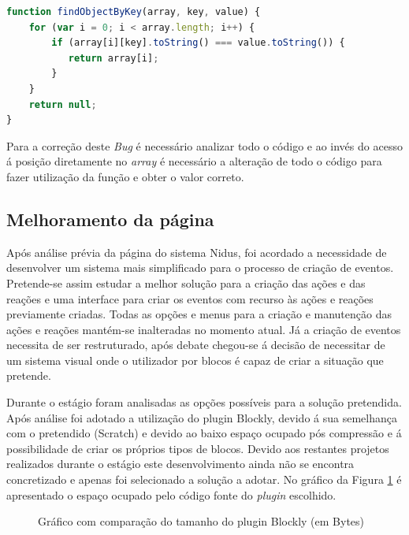 \begin{lstlisting}[caption=Função findObjectByKey,label={js2},language=JavaScript]
function findObjectByKey(array, key, value) {
    for (var i = 0; i < array.length; i++) {
        if (array[i][key].toString() === value.toString()) {
           return array[i];
        }
    }
    return null;
}
\end{lstlisting}

\par Para a correção deste \textit{Bug} é necessário analizar todo o código e ao invés do acesso á posição diretamente no \textit{array} é necessário a alteração de todo o código para fazer utilização da função e obter o valor correto.


\subsection{Melhoramento da página}
\par Após análise prévia da página do sistema Nidus, foi acordado a necessidade de desenvolver um sistema mais simplificado para o processo de criação de eventos. Pretende-se assim estudar a melhor solução para a criação das ações e das reações e uma interface para criar os eventos com recurso às ações e reações previamente criadas. Todas as opções e menus para a criação e manutenção das ações e reações mantém-se inalteradas no momento atual. Já a criação de eventos necessita de ser restruturado, após debate chegou-se á decisão de necessitar de um sistema visual onde o utilizador por blocos é capaz de criar a situação que pretende.
\par Durante o estágio foram analisadas as opções possíveis para a solução pretendida. Após análise foi adotado a utilização do plugin Blockly\cite{blockly}, devido á sua semelhança com o pretendido (Scratch) e devido ao baixo espaço ocupado pós compressão e á possibilidade de criar os próprios tipos de blocos. Devido aos restantes projetos realizados durante o estágio este desenvolvimento ainda não se encontra concretizado e apenas foi selecionado a solução a adotar. No gráfico da Figura \ref{block} é apresentado o espaço ocupado pelo código fonte do \textit{plugin} escolhido.


\begin{figure}[ht]
\centering
{}

\caption{Gráfico com comparação do tamanho do plugin Blockly (em Bytes)}\label{block}


\end{figure}



